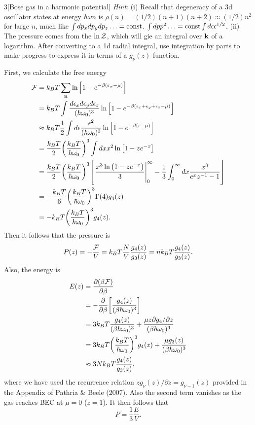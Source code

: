 \documentclass[12pt]{article}
\begin{document}
\begin{problem}{3}[Bose gas in a harmonic potential]
\textit{Hint}: (i) Recall that degeneracy of a 3d oscillator states at energy
$\hbar\omega n$ is $\rho(n)=(1/2)(n+1)(n+2)\approx(1/2)n^2$ for large $n$, much
like $\int dp_xdp_ydp_z\hdots=\text{const}$. $\int dpp^2\hdots=\text{const}\int
d\epsilon\epsilon^{1/2}$. (ii) The pressure comes from the $\ln\mathcal{Z}$, which will
gie an integral over $\vb{k}$ of a logarithm. After converting to a 1d radial
integral, use integration by parts to make progress to express it in terms of a
$g_\nu(z)$ function.
\begin{solution}
First, we calculate the free energy
\begin{align}
    \FF&=k_BT\sum_{\vb{n}}\ln\qty[1-e^{-\beta(\epsilon_\alpha-\mu)}]\notag\\
       &=k_BT\int\frac{d\epsilon_xd\epsilon_yd\epsilon_z}{(\hbar\omega_0)^3}
       \ln\qty[1-e^{-\beta(\epsilon_x+\epsilon_y+\epsilon_z-\mu)}]\notag\\
       &\approx k_BT\frac12\int d\epsilon\frac{\epsilon^2}{(\hbar\omega_0)^3}
       \ln\qty[1-e^{-\beta(\epsilon-\mu)}]\notag\\
       &=\frac{k_BT}{2}\qty(\frac{k_BT}{\hbar\omega_0})^3\int dx
       x^2\ln\qty[1-z e^{-x}]\notag\\
       &=\frac{k_BT}{2}\qty(\frac{k_BT}{\hbar\omega_0})^3\qty[\eval{\frac{x^3\ln\qty(1-ze^{-x})}{3}}_0^\infty-\frac13\int_0^\infty
       dx\frac{x^3}{e^xz^{-1}-1}]\notag\\
       &=-\frac{k_BT}{6}\qty(\frac{k_BT}{\hbar\omega_0})^3\Gamma(4)g_4(z)\notag\\
       &=-k_BT\qty(\frac{k_BT}{\hbar\omega_0})^3g_4(z).
\end{align}
Then it follows that the pressure is
\begin{equation}
    P(z)=-\frac{\mathcal{F}}{V}=k_BT\frac{N}{V}\frac{g_4(z)}{g_3(z)}
    =nk_BT\frac{g_4(z)}{g_3(z)}.
\end{equation}
Also, the energy is
\begin{align}
    E(z)
    &=\frac{\partial(\beta\mathcal{F})}{\partial\beta}\notag\\
    &=-\frac{\partial}{\partial\beta}\qty[\frac{g_4(z)}{(\beta\hbar\omega_0)^3}]
    \notag\\
    &=3k_BT\frac{g_4(z)}{(\beta\hbar\omega_0)^3}+\frac{\mu z\partial
    g_4/\partial z}{(\beta\hbar\omega_0)^3}\notag\\
    &=3k_BT\qty(\frac{k_BT}{\hbar\omega_0})^3g_4(z)+\frac{\mu
    g_3(z)}{(\beta\hbar\omega_0)^3}\notag\\
    &\approx 3Nk_BT\frac{g_4(z)}{g_3(z)},
\end{align}
where we have used the recurrence relation $z g_\nu(z)/\partial z=g_{\nu-1}(z)$
provided in the Appendix of Pathria \& Beele (2007). Also the second term
vanishes as the gas reaches BEC at $\mu=0$ ($z=1$). It then follows that
\begin{equation}
    P=\frac13\frac{E}{V}. 
\end{equation}
\end{solution}


\end{problem}
\end{document}
